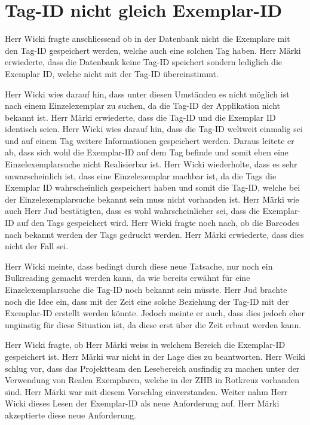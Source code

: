 \documentclass[parskip=full, a4paper]{scrreprt}
\begin{document}
\section{Tag-ID nicht gleich Exemplar-ID}
\label{result:noSingleTagReachable}
Herr Wicki fragte anschliessend ob in der Datenbank nicht die Exemplare mit den Tag-ID gespeichert werden, welche auch eine solchen Tag haben. Herr Märki erwiederte, dass die Datenbank keine Tag-ID speichert sondern lediglich die Exemplar ID, welche nicht mit der Tag-ID übereinstimmt.

Herr Wicki wies darauf hin, dass unter diesen Umständen es nicht möglich ist nach einem Einzelexemplar zu suchen, da die Tag-ID der Applikation nicht bekannt ist. Herr Märki erwiederte, dass die Tag-ID und die Exemplar ID identisch seien. Herr Wicki wies darauf hin, dass die Tag-ID weltweit einmalig sei und auf einem Tag weitere Informationen gespeichert werden. Daraus leitete er ab, dass sich wohl die Exemplar-ID auf dem Tag befinde und somit eben eine Einzelexemplarsuche nicht Realisierbar ist. Herr Wicki wiederholte, dass es sehr unwarscheinlich ist, dass eine Einzelexemplar machbar ist, da die Tags die Exemplar ID wahrscheinlich gespeichert haben und somit die Tag-ID, welche bei der Einzelexemplarsuche bekannt sein muss nicht vorhanden ist. Herr Märki wie auch Herr Jud bestätigten, dass es wohl wahrscheinlicher sei, dass die Exemplar-ID auf den Tags gespeichert wird. Herr Wicki fragte noch nach, ob die Barcodes nach bekannt werden der Tags gedruckt werden. Herr Märki erwiederte, dass dies nicht der Fall sei.

Herr Wicki meinte, dass bedingt durch diese neue Tatsache, nur noch ein Bulkreading gemacht werden kann, da wie bereits erwähnt für eine Einzelexemplarsuche die Tag-ID noch bekannt sein müsste. Herr Jud brachte noch die Idee ein, dass mit der Zeit eine solche Beziehung der Tag-ID mit der Exemplar-ID erstellt werden könnte. Jedoch meinte er auch, dass dies jedoch eher ungünstig für diese Situation ist, da diese erst über die Zeit erbaut werden kann.

Herr Wicki fragte, ob Herr Märki weiss in welchem Bereich die Exemplar-ID gespeichert ist. Herr Märki war nicht in der Lage dies zu beantworten. Herr Wciki schlug vor, dass das Projektteam den Lesebereich ausfindig zu machen unter der Verwendung von Realen Exemplaren, welche in der ZHB in Rotkreuz vorhanden sind. Herr Märki war mit diesem Vorschlag einverstanden. Weiter nahm Herr Wicki dieses Lesen der Exemplar-ID als neue Anforderung auf. Herr Märki akzeptierte diese neue Anforderung.
\end{document}
